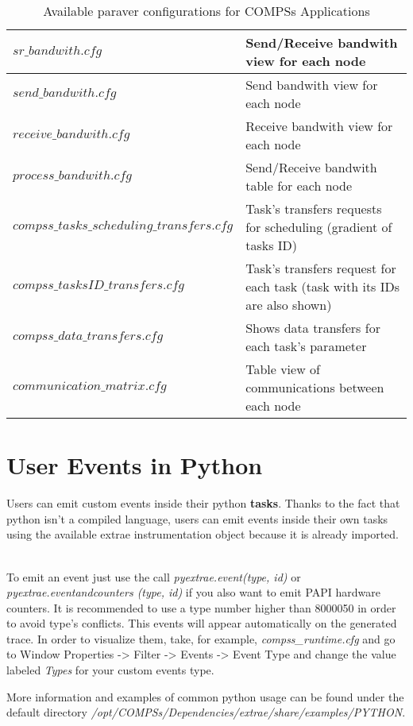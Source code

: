 \bgroup
  \def\arraystretch{1.5}
  \begin{table}[h]
    \begin{center}
      \begin{tabular}{| p{} | p{} |}
	\hline
	$sr\_bandwith.cfg$ 			& Send/Receive bandwith view for each node \\ \hline
	$send\_bandwith.cfg$ 			& Send bandwith view for each node \\ \hline
	$receive\_bandwith.cfg$ 		& Receive bandwith view for each node \\ \hline
	$process\_bandwith.cfg$ 		& Send/Receive bandwith table for each node \\ \hline
	$compss\_tasks\_scheduling\_transfers.cfg$ 		& Task's transfers requests for scheduling (gradient of tasks ID) \\ \hline
	$compss\_tasksID\_transfers.cfg$ 	& Task's transfers request for each task (task with its IDs are also shown) \\ \hline
	$compss\_data\_transfers.cfg$ 		& Shows data transfers for each task's parameter \\ \hline
	$communication\_matrix.cfg$ 		& Table view of communications between each node \\ \hline
      \end{tabular}
      \caption{Available paraver configurations for COMPSs Applications}
      \label{tab:paraver_configs}
    \end{center}
  \end{table}
\egroup


\section{User Events in Python}

Users can emit custom events inside their python \textbf{tasks}. Thanks to the fact that python isn't a compiled language, 
users can emit events inside their own tasks using the available extrae instrumentation object because it is already imported.
~ \newline

To emit an event just use the call \textit{pyextrae.event(type, id)} or \textit{pyextrae.eventandcounters
(type, id)} if you also want to emit PAPI hardware counters. It is recommended to use a type number higher than 8000050 in order 
to avoid type's conflicts. This events will appear automatically on the generated trace. In order to visualize them, take, 
for example, \textit{compss\_runtime.cfg} and go to Window Properties -> Filter -> Events -> Event Type and change the 
value labeled \textit{Types} for your custom events type.
~ \newline

More information and examples of common python usage can be found under the default directory 
\textit{/opt/COMPSs/Dependencies/extrae/share/examples/PYTHON}.

